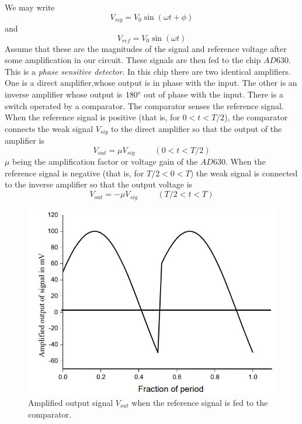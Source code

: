 \documentclass[%
 reprint,
nofootinbib,
 amsmath,amssymb,
 aps,
]{revtex4-2}
\begin{document}
    \par
    We may write
    \begin{equation}
        V_{sig} = V_0 \sin (\omega t + \phi)
    \end{equation}
    and
    \begin{equation}
        V_{ref} = V_0 \sin (\omega t)
    \end{equation}
    Assume that these are the magnitudes of the signal and reference voltage after some amplification in our circuit. These signals are then fed to the chip $AD630$. This is a \textit{phase sensitive detector}. In this chip there are two identical amplifiers. One is a direct amplifier,whose output is in phase with the input. The other is an inverse amplifier whose output is $180 \degree$ out of phase with the input. There is a switch operated by a comparator. The comparator senses the reference signal. When the reference signal is positive (that is, for $0 < t < T/2$), the comparator connects the weak signal $V_{sig}$ to the direct amplifier so that the output of the amplifier is
    \begin{equation}
        V_{out} = \mu V_{sig} \hspace{1cm} (0 < t < T/2)
    \end{equation}
    $\mu$ being the amplification factor or voltage gain of the $AD630$. When the reference signal is negative (that is, for $T/2 < 0 < T$) the weak signal is connected to the inverse amplifier so that the output voltage is
    \begin{equation}
        V_{out} = - \mu V_{sig} \hspace{1cm} (T/2 < t < T)
    \end{equation}
    \begin{figure}
        \centering
        \includegraphics[scale = 0.6]{Figures/ampoutputComp.png}
        \caption{Amplified output signal $V_{out}$ when the reference signal is fed to the comparator.}
        \label{fig:outcomp}
    \end{figure}
\end{document}
